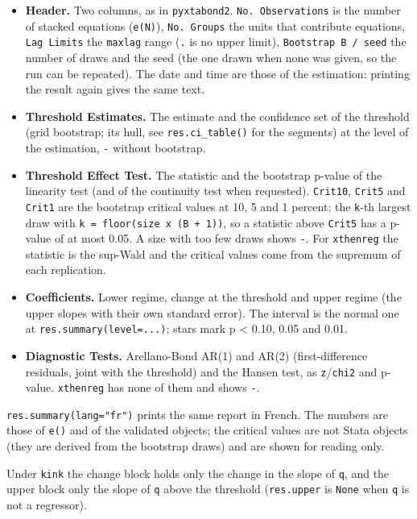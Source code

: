 \documentclass[
  10.5pt,
  a4paper,
]{article}
\newcounter{none} %
\providecommand{\tightlist}{%
  \setlength{\itemsep}{0pt}\setlength{\parskip}{0pt}}
\begin{document}
\begin{itemize}
\tightlist
\item
  \textbf{Header.} Two columns, as in \texttt{pyxtabond2}.
  \texttt{No.\ Observations} is the number of stacked equations
  (\texttt{e(N)}), \texttt{No.\ Groups} the units that contribute
  equations, \texttt{Lag\ Limits} the \texttt{maxlag} range (\texttt{.}
  is no upper limit), \texttt{Bootstrap\ B\ /\ seed} the number of draws
  and the seed (the one drawn when none was given, so the run can be
  repeated). The date and time are those of the estimation: printing the
  result again gives the same text.
\item
  \textbf{Threshold Estimates.} The estimate and the confidence set of
  the threshold (grid bootstrap; its hull, see \texttt{res.ci\_table()}
  for the segments) at the level of the estimation, \texttt{-} without
  bootstrap.
\item
  \textbf{Threshold Effect Test.} The statistic and the bootstrap
  p-value of the linearity test (and of the continuity test when
  requested). \texttt{Crit10}, \texttt{Crit5} and \texttt{Crit1} are the
  bootstrap critical values at 10, 5 and 1 percent: the \texttt{k}-th
  largest draw with \texttt{k\ =\ floor(size\ x\ (B\ +\ 1))}, so a
  statistic above \texttt{Crit5} has a p-value of at most 0.05. A size
  with too few draws shows \texttt{-}. For \texttt{xthenreg} the
  statistic is the sup-Wald and the critical values come from the
  supremum of each replication.
\item
  \textbf{Coefficients.} Lower regime, change at the threshold and upper
  regime (the upper slopes with their own standard error). The interval
  is the normal one at \texttt{res.summary(level=...)}; stars mark p
  \textless{} 0.10, 0.05 and 0.01.
\item
  \textbf{Diagnostic Tests.} Arellano-Bond AR(1) and AR(2)
  (first-difference residuals, joint with the threshold) and the Hansen
  test, as \texttt{z}/\texttt{chi2} and p-value. \texttt{xthenreg} has
  none of them and shows \texttt{-}.
\end{itemize}

\texttt{res.summary(lang="fr")} prints the same report in French. The
numbers are those of \texttt{e()} and of the validated objects; the
critical values are not Stata objects (they are derived from the
bootstrap draws) and are shown for reading only.

Under \texttt{kink} the change block holds only the change in the slope
of \texttt{q}, and the upper block only the slope of \texttt{q} above
the threshold (\texttt{res.upper} is \texttt{None} when \texttt{q} is
not a regressor).
\end{document}
